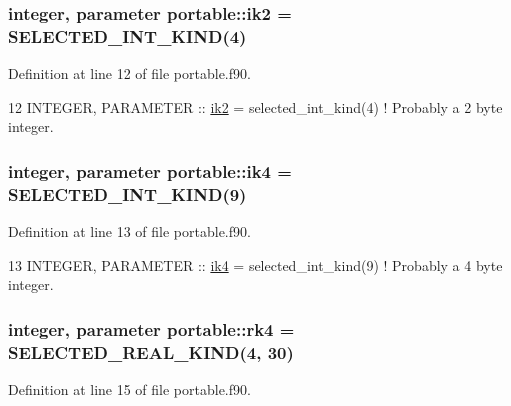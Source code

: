 \subsubsection[{\texorpdfstring{ik2}{ik2}}]{\setlength{\rightskip}{0pt plus 5cm}integer, parameter portable\+::ik2 = S\+E\+L\+E\+C\+T\+E\+D\+\_\+\+I\+N\+T\+\_\+\+K\+I\+ND(4)}\hypertarget{namespaceportable_a35a0fbff20f9df8a8a5de95c97dc7d5d}{}\label{namespaceportable_a35a0fbff20f9df8a8a5de95c97dc7d5d}


Definition at line 12 of file portable.\+f90.


\begin{DoxyCode}
12 \textcolor{keywordtype}{INTEGER}, \textcolor{keywordtype}{PARAMETER}  :: \hyperlink{namespaceportable_a35a0fbff20f9df8a8a5de95c97dc7d5d}{ik2} = selected\_int\_kind(4)       \textcolor{comment}{! Probably a 2 byte integer.}
\end{DoxyCode}
\subsubsection[{\texorpdfstring{ik4}{ik4}}]{\setlength{\rightskip}{0pt plus 5cm}integer, parameter portable\+::ik4 = S\+E\+L\+E\+C\+T\+E\+D\+\_\+\+I\+N\+T\+\_\+\+K\+I\+ND(9)}\hypertarget{namespaceportable_aa110cf333432508140602ea192c4b2ea}{}\label{namespaceportable_aa110cf333432508140602ea192c4b2ea}


Definition at line 13 of file portable.\+f90.


\begin{DoxyCode}
13 \textcolor{keywordtype}{INTEGER}, \textcolor{keywordtype}{PARAMETER}  :: \hyperlink{namespaceportable_aa110cf333432508140602ea192c4b2ea}{ik4} = selected\_int\_kind(9)       \textcolor{comment}{! Probably a 4 byte integer.}
\end{DoxyCode}
\subsubsection[{\texorpdfstring{rk4}{rk4}}]{\setlength{\rightskip}{0pt plus 5cm}integer, parameter portable\+::rk4 = S\+E\+L\+E\+C\+T\+E\+D\+\_\+\+R\+E\+A\+L\+\_\+\+K\+I\+ND(4, 30)}\hypertarget{namespaceportable_abaed22a509442771d3fba69bebda0b33}{}\label{namespaceportable_abaed22a509442771d3fba69bebda0b33}


Definition at line 15 of file portable.\+f90.


